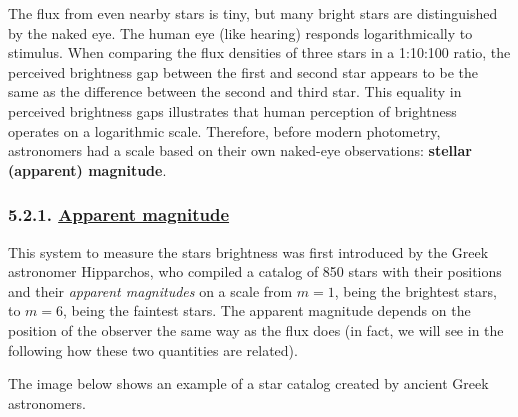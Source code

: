 \documentclass[
  letterpaper,
  DIV=11,
  numbers=noendperiod]{scrartcl}
\begin{document}
The flux from even nearby stars is tiny, but many bright stars are
distinguished by the naked eye. The human eye (like hearing) responds
logarithmically to stimulus. When comparing the flux densities of three
stars in a 1:10:100 ratio, the perceived brightness gap between the
first and second star appears to be the same as the difference between
the second and third star. This equality in perceived brightness gaps
illustrates that human perception of brightness operates on a
logarithmic scale. Therefore, before modern photometry, astronomers had
a scale based on their own naked-eye observations: \textbf{stellar
(apparent) magnitude}.

\hypertarget{apparent-magnitude}{%
\subsubsection{\texorpdfstring{5.2.1. \protect\hyperlink{toc0_}{Apparent
magnitude}}{5.2.1. Apparent magnitude}}\label{apparent-magnitude}}

This system to measure the stars brightness was first introduced by the
Greek astronomer Hipparchos, who compiled a catalog of 850 stars with
their positions and their \emph{apparent magnitudes} on a scale from
\(m=1\), being the brightest stars, to \(m=6\), being the faintest
stars. The apparent magnitude depends on the position of the observer
the same way as the flux does (in fact, we will see in the following how
these two quantities are related).

The image below shows an example of a star catalog created by ancient
Greek astronomers.
\end{document}
